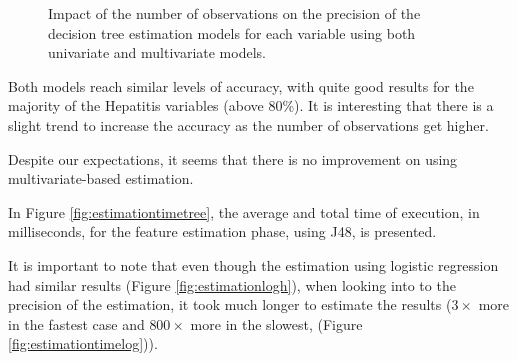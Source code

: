 \begin{figure}[h]
  \begin{subfigmatrix}{2}
  \end{subfigmatrix}
  \caption{Impact of the number of observations on the precision of the decision tree estimation models for each variable using both univariate and multivariate models.}
  \label{fig:estimationtreeh}
\end{figure}
 
Both models reach similar levels of accuracy, with quite good results for the majority of the Hepatitis variables
 (above 80\%). It is interesting that there is a slight trend to increase the accuracy as the number of observations get higher.

Despite our expectations, it seems that there is no improvement on using multivariate-based estimation.

In Figure \ref{fig:estimationtimetree}, the average and total time of execution, in milliseconds, for the feature estimation phase, using J48, is presented. 

It is important to note that even though the estimation using logistic regression had similar results (Figure \ref{fig:estimationlogh}),
 when looking into to the precision of the estimation, it took much longer to estimate the results
 ($3\times$ more in the fastest case and $800\times$ more in the slowest, (Figure \ref{fig:estimationtimelog})).

